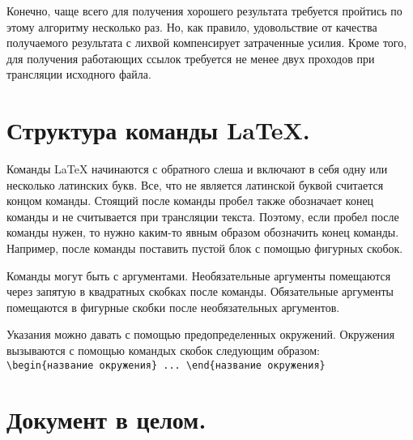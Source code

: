 Конечно, чаще всего для получения хорошего результата требуется пройтись по этому 
алгоритму несколько раз. Но, как правило, удовольствие от качества получаемого  
результата с лихвой компенсирует затраченные усилия.
Кроме того, для получения работающих ссылок требуется не менее двух проходов при
трансляции исходного файла.
\section{Структура команды \LaTeX.}
Команды \LaTeX{} начинаются с обратного слеша и включают в себя одну или несколько 
латинских букв. Все, что не является латинской буквой считается концом команды. Стоящий
после команды пробел также обозначает конец команды и не считывается при трансляции 
текста. Поэтому, если пробел после команды нужен, то нужно каким-то явным образом 
обозначить конец команды. Например, после команды поставить пустой блок с помощью 
фигурных скобок. 

Команды могут быть с аргументами. Необязательные аргументы помещаются через запятую в 
квадратных скобках после команды. Обязательные аргументы помещаются в фигурные скобки
после необязательных аргументов.

Указания  можно давать с помощью предопределенных окружений. Окружения вызываются
с помощью командых скобок следующим образом:\\
\verb|\begin{название окружения} ... \end{название окружения}|

\section{Документ в целом.}

